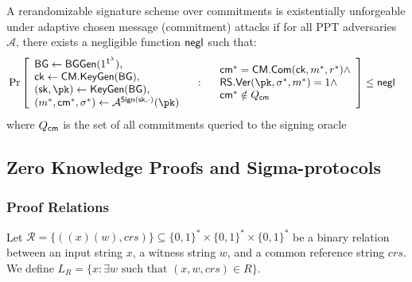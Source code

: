 \begin{definition}
A rerandomizable signature scheme over commitments is existentially unforgeable under adaptive chosen message (commitment) attacks if for all PPT adversaries $\mathcal{A}$, there exists a negligible function $\mathsf{negl}$ such that:
    \begin{align*}
        &\Pr\left[
            \begin{array}{l}
                \mathsf{BG} \gets \mathsf{BGGen}(1^{\secparam}), \\
                \mathsf{ck} \gets \mathsf{CM.KeyGen}(\mathsf{BG}), \\
                (\sk, \pk) \gets \mathsf{KeyGen}(\mathsf{BG}), \\
                (m^*, \cm^*, \sigma^*) \gets \mathcal{A}^{\mathsf{Sign}(\sk, \cdot)}(\pk) \\
                \end{array}
                \quad : \quad
                \begin{array}{l}
                \cm^* = \mathsf{CM.Com}(\mathsf{ck}, m^*, r^*) \land \\
                \mathsf{RS.Ver}(\pk, \sigma^*, m^*) = 1 \land \\
                \cm^* \notin Q_{\cm}
            \end{array}
        \right] \leq \negl
    \end{align*}
where $Q_{\mathsf{cm}}$ is the set of all commitments queried to the signing oracle
\end{definition}









\subsection{Zero Knowledge Proofs and Sigma-protocols}

\subsubsection{Proof Relations}
\begin{definition}[Relation]
Let $\mathcal{R}  = \{((x)(w),crs)\} \subseteq \{0,1\}^* \times \{0,1\}^* \times \{0,1\}^*$ be a binary relation between an input string $x$, a witness string $w$, and a common reference string $crs$. We define $L_R = \{x : \exists w \text{ such that } (x,w,crs) \in R\}$.    
\end{definition}

